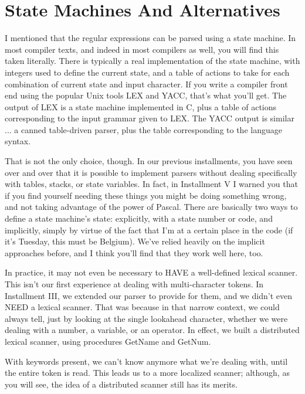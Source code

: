 \documentclass[float=false, crop=false]{standalone}
\begin{document}
\section{State Machines And Alternatives}

I mentioned that the regular expressions can be parsed using a state machine. In
most compiler texts, and indeed in most compilers as well, you will find this
taken literally. There is typically a real implementation of the state machine,
with integers used to define the current state, and a table of actions to take
for each combination of current state and input character. If you write a
compiler front end using the popular Unix tools LEX and YACC, that's what you'll
get. The output of LEX is a state machine implemented in C, plus a table of
actions corresponding to the input grammar given to LEX. The YACC output is
similar ... a canned table-driven parser, plus the table corresponding to the
language syntax.

That is not the only choice, though. In our previous installments, you have seen
over and over that it is possible to implement parsers without dealing
specifically with tables, stacks, or state variables. In fact, in Installment V
I warned you that if you find yourself needing these things you might be doing
something wrong, and not taking advantage of the power of Pascal. There are
basically two ways to define a state machine's state: explicitly, with a state
number or code, and implicitly, simply by virtue of the fact that I'm at a
certain place in the code (if it's Tuesday, this must be Belgium). We've relied
heavily on the implicit approaches before, and I think you'll find that they
work well here, too.

In practice, it may not even be necessary to HAVE a well-defined lexical
scanner. This isn't our first experience at dealing with multi-character tokens.
In Installment III, we extended our parser to provide for them, and we didn't
even NEED a lexical scanner. That was because in that narrow context, we could
always tell, just by looking at the single lookahead character, whether we were
dealing with a number, a variable, or an operator. In effect, we built a
distributed lexical scanner, using procedures GetName and GetNum.

With keywords present, we can't know anymore what we're dealing with, until the
entire token is read. This leads us to a more localized scanner; although, as
you will see, the idea of a distributed scanner still has its merits.
\end{document}
